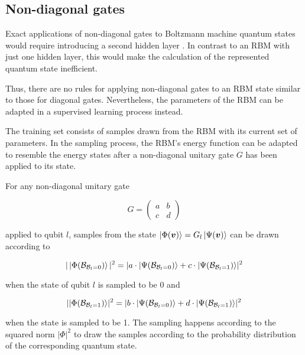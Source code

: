 \subsection{Non-diagonal gates}

Exact applications of non-diagonal gates to Boltzmann machine quantum states would require introducing a second hidden layer \cite{carleo2018constructing}. In contrast to an RBM with just one hidden layer, this would make the calculation of the represented quantum state inefficient.

Thus, there are no rules for applying non-diagonal gates to an RBM state similar to those for diagonal gates. Nevertheless, the parameters of the RBM can be adapted in a 
supervised learning process instead.

The training set consists of samples drawn from the RBM with its current set of parameters. In the sampling process, the RBM's energy function can be adapted to resemble the energy states after a non-diagonal unitary gate $ G $ has been applied to its state.

For any non-diagonal unitary gate

\begin{equation}
    G =  \begin{pmatrix}
        a & b \\
        c & d
    \end{pmatrix}
\end{equation}

applied to qubit $l$, samples from the state $\ket{\Phi(\bm{v})} = G_l\ket{\Psi(\bm{v})}$ can be drawn according to 

\begin{equation}
    | \ket{\Phi(\mathcal{B}_{\mathcal{B}_l = 0})} |^2 = 
    \lvert  a \cdot \ket{\Psi(\mathcal{B}_{\mathcal{B}_l = 0})} +
            c \cdot \ket{\Psi(\mathcal{B}_{\mathcal{B}_l = 1})}
    \rvert^2
\end{equation}

when the state of qubit $l$ is sampled to be 0 and 

\begin{equation}
    \lvert \ket{\Phi(\mathcal{B}_{\mathcal{B}_l = 1})} \rvert^2 = 
    \lvert  b \cdot \ket{\Psi(\mathcal{B}_{\mathcal{B}_l = 0})} +
            d \cdot \ket{\Psi(\mathcal{B}_{\mathcal{B}_l = 1})}
    \rvert^2
\end{equation}

when the state is sampled to be 1. The sampling happens according to the squared norm
$\lvert \Phi \rvert^2$ to draw the samples according to the probability distribution of the 
corresponding quantum state.

